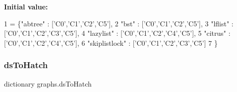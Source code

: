 {\bfseries Initial value\+:}
\begin{DoxyCode}
1 =  \{\textcolor{stringliteral}{"abtree"} :       [\textcolor{stringliteral}{'C0'},\textcolor{stringliteral}{'C1'},\textcolor{stringliteral}{'C2'},\textcolor{stringliteral}{'C5'}],
2              \textcolor{stringliteral}{"bst"} :          [\textcolor{stringliteral}{'C0'},\textcolor{stringliteral}{'C1'},\textcolor{stringliteral}{'C2'},\textcolor{stringliteral}{'C5'}],
3              \textcolor{stringliteral}{"lflist"} :       [\textcolor{stringliteral}{'C0'},\textcolor{stringliteral}{'C1'},\textcolor{stringliteral}{'C2'},\textcolor{stringliteral}{'C3'},\textcolor{stringliteral}{'C5'}],
4              \textcolor{stringliteral}{"lazylist"} :     [\textcolor{stringliteral}{'C0'},\textcolor{stringliteral}{'C1'},\textcolor{stringliteral}{'C2'},\textcolor{stringliteral}{'C4'},\textcolor{stringliteral}{'C5'}],
5              \textcolor{stringliteral}{"citrus"} :       [\textcolor{stringliteral}{'C0'},\textcolor{stringliteral}{'C1'},\textcolor{stringliteral}{'C2'},\textcolor{stringliteral}{'C4'},\textcolor{stringliteral}{'C5'}],
6              \textcolor{stringliteral}{"skiplistlock"} : [\textcolor{stringliteral}{'C0'},\textcolor{stringliteral}{'C1'},\textcolor{stringliteral}{'C2'},\textcolor{stringliteral}{'C3'},\textcolor{stringliteral}{'C5'}]
7             \}
\end{DoxyCode}
\mbox{\label{namespacegraphs_a1145412cb5f02d21446dd3c6d1944f5c}} 
\subsubsection{\texorpdfstring{ds\+To\+Hatch}{dsToHatch}}
{\footnotesize\ttfamily dictionary graphs.\+ds\+To\+Hatch}

